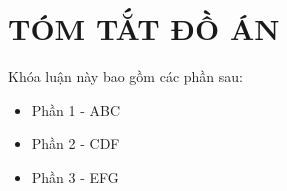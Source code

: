 \documentclass[../main-report.tex]{subfiles}
\begin{document}
\part*{TÓM TẮT ĐỒ ÁN}
Khóa luận này bao gồm các phần sau:

\begin{itemize}
\item Phần 1 - ABC
\item Phần 2 - CDF
\item Phần 3 - EFG
\end{itemize}
\end{document}
